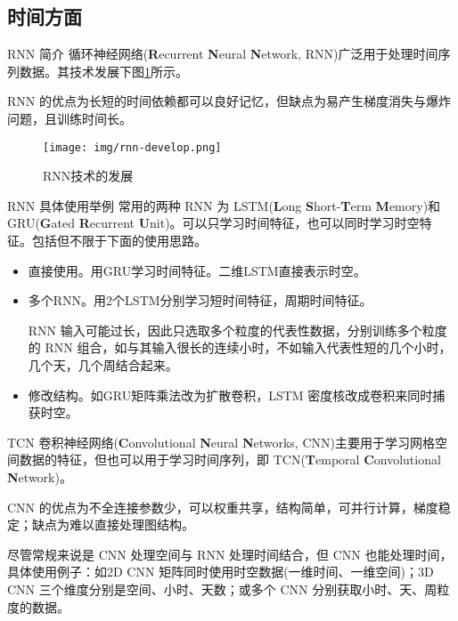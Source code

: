 \documentclass{libs/format}
\begin{document}
\subsection{时间方面}

\begin{frame}{RNN 简介}
  循环神经网络(\textbf{R}ecurrent \textbf{N}eural \textbf{N}etwork, RNN)广泛用于处理时间序列数据。其技术发展下图\ref{fig:rnn-develop}所示。

  RNN 的优点为长短的时间依赖都可以良好记忆，但缺点为易产生梯度消失与爆炸问题，且训练时间长。\cite{T-ZS1}
  \begin{figure}
    \centering
    \texttt{[image: img/rnn-develop.png]}
    \caption{RNN技术的发展\cite{T-ZS25}}\label{fig:rnn-develop}
  \end{figure}
\end{frame}

\begin{frame}{RNN 具体使用举例}
  常用的两种 RNN 为 LSTM(\textbf{L}ong \textbf{S}hort-\textbf{T}erm \textbf{M}emory)和GRU(\textbf{G}ated \textbf{R}ecurrent \textbf{U}nit)。可以只学习时间特征，也可以同时学习时空特征。包括但不限于下面的使用思路。
  \begin{itemize}
    \item 直接使用。用GRU学习时间特征\cite{T-36}。二维LSTM直接表示时空\cite{T-46}。
    \item 多个RNN。用2个LSTM分别学习短时间特征，周期时间特征\cite{T-3}。
    
    RNN 输入可能过长，因此只选取多个粒度的代表性数据，分别训练多个粒度的 RNN 组合，如与其输入很长的连续小时，不如输入代表性短的几个小时，几个天，几个周结合起来。\cite{T-ZS1}
    \item 修改结构。如GRU矩阵乘法改为扩散卷积\cite{T-40}，LSTM 密度核改成卷积来同时捕获时空\cite{T-30}。
  \end{itemize}
\end{frame}

\begin{frame}{TCN}
  卷积神经网络(\textbf{C}onvolutional \textbf{N}eural \textbf{N}etworks, CNN)主要用于学习网格空间数据的特征，但也可以用于学习时间序列，即 TCN(\textbf{T}emporal \textbf{C}onvolutional \textbf{N}etwork)。

  CNN 的优点为不全连接参数少，可以权重共享，结构简单，可并行计算，梯度稳定；缺点为难以直接处理图结构。\cite{T-ZS1, T-ZS2}


  尽管常规来说是 CNN 处理空间与 RNN 处理时间结合，但 CNN 也能处理时间，具体使用例子：如2D CNN 矩阵同时使用时空数据(一维时间、一维空间)\cite{T-33}；3D CNN 三个维度分别是空间、小时、天数\cite{T-52}；或多个 CNN 分别获取小时、天、周粒度的数据\cite{T-51}。
\end{frame}
\end{document}

